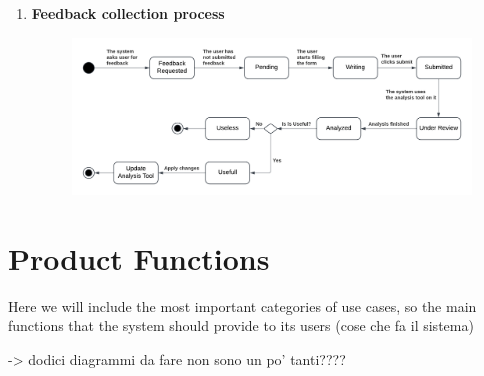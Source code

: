\begin{enumerate}
\item \textbf{Feedback collection process}
\begin{figure}[H]
    \centering
    \includegraphics[width=1\linewidth]{RASD//Images/feedback2.png}
    \caption{}
    \label{fig:enter-label}
\end{figure}

\end{enumerate}
\section{Product Functions}

Here we will include the most important categories of use cases, so the main functions that the system should provide to its users (cose che fa il sistema)

-> dodici diagrammi da fare non sono un po' tanti????

